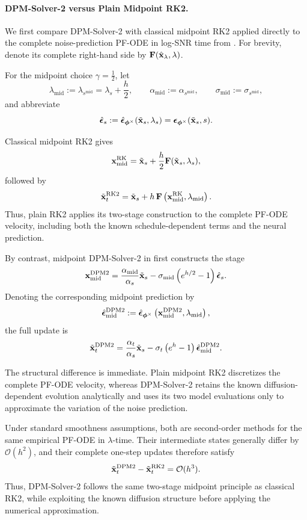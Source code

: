 \paragraph{DPM-Solver-2 versus Plain Midpoint RK2.}
We first compare DPM-Solver-2 with classical midpoint RK2 applied directly to
the complete noise-prediction PF-ODE in log-SNR time from
. For brevity, denote its complete
right-hand side by ${\mathbf{F}}(\hat{{\mathbf{x}}}_\lambda,\lambda)$.

For the midpoint choice $\gamma=\tfrac12$, let
\[
\lambda_{\mathrm{mid}}
:=
\lambda_{s^{\mathrm{mid}}}
=
\lambda_s+\frac{h}{2},
\qquad
\alpha_{\mathrm{mid}}
:=
\alpha_{s^{\mathrm{mid}}},
\qquad
\sigma_{\mathrm{mid}}
:=
\sigma_{s^{\mathrm{mid}}},
\]
and abbreviate
\[
\hat{{\bm{\epsilon}}}_s
:=
\hat{{\bm{\epsilon}}}_{\bm{\phi}^\times}(\tilde{{\mathbf{x}}}_s,\lambda_s)
=
{\bm{\epsilon}}_{\bm{\phi}^\times}(\tilde{{\mathbf{x}}}_s,s).
\]

Classical midpoint RK2 gives
\[
{\mathbf{x}}_{\mathrm{mid}}^{\mathrm{RK}}
=
\tilde{{\mathbf{x}}}_s
+
\frac{h}{2}
{\mathbf{F}}(\tilde{{\mathbf{x}}}_s,\lambda_s),
\]
followed by
\[
\tilde{{\mathbf{x}}}_t^{\mathrm{RK2}}
=
\tilde{{\mathbf{x}}}_s
+
h\,
{\mathbf{F}}
\left(
{\mathbf{x}}_{\mathrm{mid}}^{\mathrm{RK}},
\lambda_{\mathrm{mid}}
\right).
\]
Thus, plain RK2 applies its two-stage construction to the complete PF-ODE
velocity, including both the known schedule-dependent terms and the neural
prediction.

By contrast, midpoint DPM-Solver-2 in  first constructs
the stage
\[
{\mathbf{x}}_{\mathrm{mid}}^{\mathrm{DPM2}}
=
\frac{\alpha_{\mathrm{mid}}}{\alpha_s}\tilde{{\mathbf{x}}}_s
-
\sigma_{\mathrm{mid}}
\left(
e^{h/2}-1
\right)
\hat{{\bm{\epsilon}}}_s.
\]
Denoting the corresponding midpoint prediction by
\[
\hat{{\bm{\epsilon}}}_{\mathrm{mid}}^{\mathrm{DPM2}}
:=
\hat{{\bm{\epsilon}}}_{\bm{\phi}^\times}
\left(
{\mathbf{x}}_{\mathrm{mid}}^{\mathrm{DPM2}},
\lambda_{\mathrm{mid}}
\right),
\]
the full update is
\[
\tilde{{\mathbf{x}}}_t^{\mathrm{DPM2}}
=
\frac{\alpha_t}{\alpha_s}\tilde{{\mathbf{x}}}_s
-
\sigma_t
\left(
e^h-1
\right)
\hat{{\bm{\epsilon}}}_{\mathrm{mid}}^{\mathrm{DPM2}}.
\]

The structural difference is immediate. Plain midpoint RK2 discretizes the
complete PF-ODE velocity, whereas DPM-Solver-2 retains the known
diffusion-dependent evolution analytically and uses its two model evaluations
only to approximate the variation of the noise prediction.

Under standard smoothness assumptions, both are second-order methods for the
same empirical PF-ODE in $\lambda$-time. Their intermediate states generally
differ by $\mathcal O(h^2)$, and their complete one-step updates therefore
satisfy
\[
\tilde{{\mathbf{x}}}_t^{\mathrm{DPM2}}
-
\tilde{{\mathbf{x}}}_t^{\mathrm{RK2}}
=
\mathcal O(h^3).
\]
Thus, DPM-Solver-2 follows the same two-stage midpoint principle as classical
RK2, while exploiting the known diffusion structure before applying the
numerical approximation.

